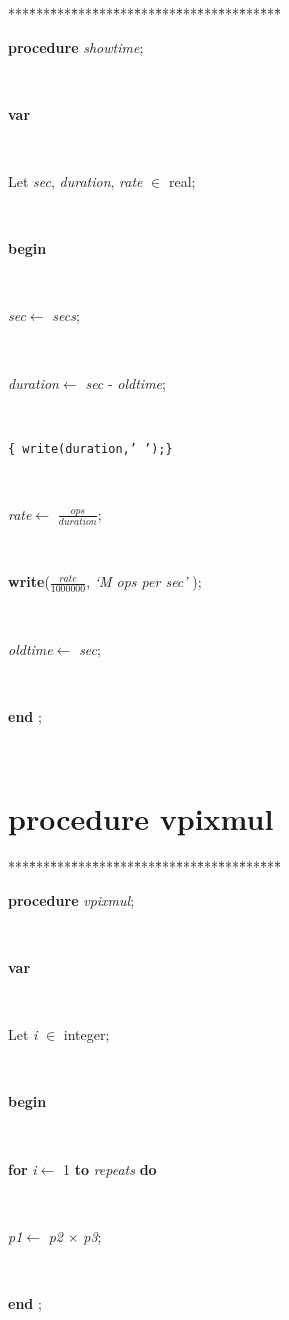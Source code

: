 \documentclass[10pt, a4paper]{article}
\begin{document}
\begin{tabbing}
***\=***\=***\=***\=***\=***\=***\=***\=***\=***\=***\=***\=***\=\kill
\parbox{14cm}{\textsf {\textbf {procedure } \textsf{\textit{showtime}}; }}\\
\+\parbox{14cm}{\textsf{\textbf{var} }}\\
\parbox{14cm}{\textsf{Let \textit{sec}, \textit{duration}, \textit{rate} $\in$ real;}}\\
\-\<\+\parbox{14cm}{\textsf{\textbf{begin} }}\\
\parbox{14cm}{\textsf{\textit{sec}$\leftarrow$ \textit{secs}}; }\\
\parbox{14cm}{\textsf{\textit{duration}$\leftarrow$ \textit{sec} - \textit{oldtime}}; }\\
\parbox{14cm}{\texttt{\small{\{	write(duration,'  ');\}}}}\\
\parbox{14cm}{\textsf{\textit{rate}$\leftarrow$ $\frac{\textit{ops}}{\textit{duration}}$}; }\\
\parbox{14cm}{\textsf{\textbf{write}($\frac{\textit{rate}}{1000000}$, \textit{\textrm{\textup { `M ops per sec' } }})}; }\\
\parbox{14cm}{\textsf{\textit{oldtime}$\leftarrow$ \textit{sec}}; }\\
\<\-\parbox{14cm}{\textsf{\textbf{end} ;}}\\
\end{tabbing}
\section{procedure vpixmul}\label{sec:vectest/dovectestvpixmul}

\begin{tabbing}
***\=***\=***\=***\=***\=***\=***\=***\=***\=***\=***\=***\=***\=\kill
\parbox{14cm}{\textsf {\textbf {procedure } \textsf{\textit{vpixmul}}; }}\\
\+\parbox{14cm}{\textsf{\textbf{var} }}\\
\parbox{14cm}{\textsf{Let \textit{i} $\in$ integer;}}\\
\-\<\+\parbox{14cm}{\textsf{\textbf{begin} }}\\
\+\parbox{14cm}{\textsf {\textbf {for } \textsf{\textit{i}$\leftarrow$ 1} \textbf{ to } \textsf{\textit{repeats}} \textbf{ do } }}\\
\-\parbox{14cm}{\textsf{\textit{p1}$\leftarrow$ \textit{p2} $\times$ \textit{p3}}; }\\
\<\-\parbox{14cm}{\textsf{\textbf{end} ;}}\\
\end{tabbing}
\end{document}
